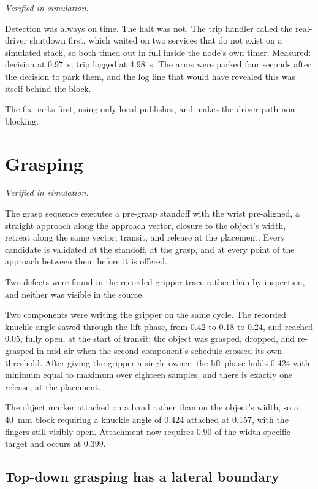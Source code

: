 \emph{Verified in simulation.}

Detection was always on time. The halt was not. The trip handler called the
real-driver shutdown first, which waited on two services that do not exist on
a simulated stack, so both timed out in full inside the node's own timer.
Measured: decision at \SI{0.97}{\second}, trip logged at
\SI{4.98}{\second}. The arms were parked four seconds after the decision to
park them, and the log line that would have revealed this was itself behind
the block.

The fix parks first, using only local publishes, and makes the driver path
non-blocking.

\section{Grasping}

\emph{Verified in simulation.}

The grasp sequence executes a pre-grasp standoff with the wrist pre-aligned, a
straight approach along the approach vector, closure to the object's width,
retreat along the same vector, transit, and release at the placement. Every
candidate is validated at the standoff, at the grasp, and at every point of
the approach between them before it is offered.

Two defects were found in the recorded gripper trace rather than by
inspection, and neither was visible in the source.

Two components were writing the gripper on the same cycle. The recorded
knuckle angle sawed through the lift phase, from \num{0.42} to \num{0.18} to
\num{0.24}, and reached \num{0.05}, fully open, at the start of transit: the
object was grasped, dropped, and re-grasped in mid-air when the second
component's schedule crossed its own threshold. After giving the gripper a
single owner, the lift phase holds \num{0.424} with minimum equal to maximum
over eighteen samples, and there is exactly one release, at the placement.

The object marker attached on a band rather than on the object's width, so a
\SI{40}{\milli\metre} block requiring a knuckle angle of \num{0.424} attached
at \num{0.157}, with the fingers still visibly open. Attachment now requires
\num{0.90} of the width-specific target and occurs at \num{0.399}.

\subsection{Top-down grasping has a lateral boundary}

